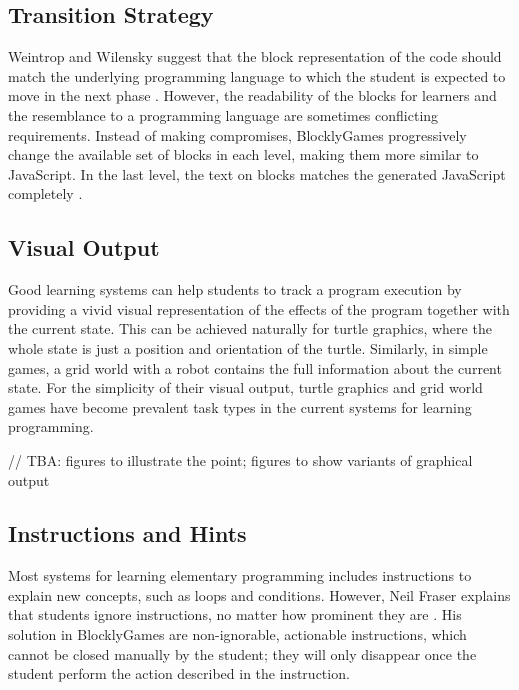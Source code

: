 \subsection{Transition Strategy}
\label{sec:transition-strategy}
Weintrop and Wilensky suggest that the block representation of the code
  should match the underlying programming language
  to which the student is expected to move in the next phase
  \cite{challenges-of-blocks-based-environments}.
However, the readability of the blocks for learners
  and the resemblance to a programming language
  are sometimes conflicting requirements.
Instead of making compromises,
  BlocklyGames progressively change the available set of blocks in each level,
  making them more similar to JavaScript.
In the last level,
  the text on blocks matches the generated JavaScript completely
  \cite{blockly-10-things}.


\subsection{Visual Output}
\label{sec:visual-output}

Good learning systems can help students to track a program execution
  by providing a vivid visual representation of the effects of the program
  together with the current state.
This can be achieved naturally for turtle graphics,
  where the whole state is just a position and orientation of the turtle.
Similarly, in simple games, a grid world with a robot
  contains the full information about the current state.
For the simplicity of their visual output,
  turtle graphics and grid world games have become prevalent task types
  in the current systems for learning programming.

// TBA: figures to illustrate the point; figures to show variants of graphical output


\subsection{Instructions and Hints}
\label{sec:instructions-and-hints}

Most systems for learning elementary programming includes instructions
  to explain new concepts, such as loops and conditions.
However, Neil Fraser explains that students ignore instructions,
  no matter how prominent they are \cite{blockly-10-things}.
His solution in BlocklyGames are non-ignorable, actionable instructions,
  which cannot be closed manually by the student;
  they will only disappear once the student perform the action described in the instruction.

